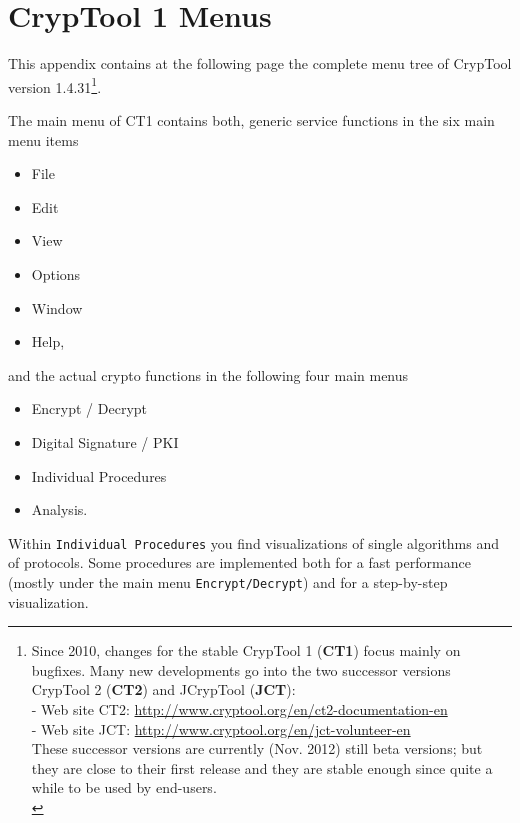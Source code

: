 
\newpage
\hypertarget{appendix-menu-overview-CT1}{}
\section{CrypTool 1 Menus}
\label{s:appendix-menu-overview-CT1}

This appendix contains at the following page the complete menu tree of
CrypTool version 1.4.31\footnote{%
  Since 2010, changes for the stable CrypTool 1 ({\bf CT1})
  focus mainly on bugfixes. Many new developments go into the two successor
  versions CrypTool 2 ({\bf CT2}) and
  JCrypTool ({\bf JCT}):\\
  - Web site CT2: \url{http://www.cryptool.org/en/ct2-documentation-en} \\
  - Web site JCT: \url{http://www.cryptool.org/en/jct-volunteer-en} \\
  These successor versions are currently (Nov. 2012) still beta versions;
  but they are close to their first release and they are stable enough
  since quite a while to be used by end-users.\\
}. 

\noindent The main menu of CT1 contains both, generic service functions in the
six main menu items
\begin{itemize}
   \item File
   \item Edit
   \item View
   \item Options
   \item Window
   \item Help,
\end{itemize}
and the actual crypto functions in the following four main menus
\begin{itemize}
   \item Encrypt / Decrypt
   \item Digital Signature / PKI
   \item Individual Procedures
   \item Analysis.
\end{itemize}

Within \verb#Individual Procedures# you find visualizations of single algorithms
and of protocols. Some procedures are implemented both for a fast performance
(mostly under the main menu \verb#Encrypt/Decrypt#) and for a step-by-step visualization.

